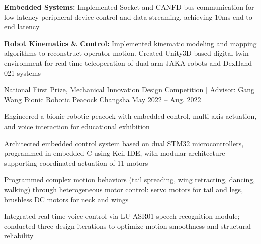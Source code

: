 \begin{cventries}
{\begin{cvitems}
        \item{\textbf{Embedded Systems:} Implemented Socket and CANFD bus communication for low-latency peripheral device control and data streaming, achieving 10ms end-to-end latency}
        \item{\textbf{Robot Kinematics \& Control:} Implemented kinematic modeling and mapping algorithms to reconstruct operator motion. Created Unity3D-based digital twin environment for real-time teleoperation of dual-arm JAKA robots and DexHand 021 systems}
      \end{cvitems}
    }
    \cventry
      {National First Prize, Mechanical Innovation Design Competition | Advisor: Gang Wang} %
      {Bionic Robotic Peacock} %
      {Changsha} %
      {May 2022 -- Aug. 2022} %
      {
        Engineered a bionic robotic peacock with embedded control, multi-axis actuation, and voice interaction for educational exhibition
        \begin{cvitems}
          \item{Architected embedded control system based on dual STM32 microcontrollers, programmed in embedded C using Keil IDE, with modular architecture supporting coordinated actuation of 11 motors}
          \item{Programmed complex motion behaviors (tail spreading, wing retracting, dancing, walking) through heterogeneous motor control: servo motors for tail and legs, brushless DC motors for neck and wings}
          \item{Integrated real-time voice control via LU-ASR01 speech recognition module; conducted three design iterations to optimize motion smoothness and structural reliability}
        \end{cvitems}
      \vspace{3mm}
      }
\end{cventries}
